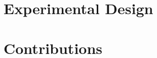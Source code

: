 \documentclass{article}
\theoremstyle{plain}
\theoremstyle{definition}
\theoremstyle{remark}
\begin{document}
\section{Experimental Design}


\section{Contributions}


\nocite{langley00}



\end{document}
